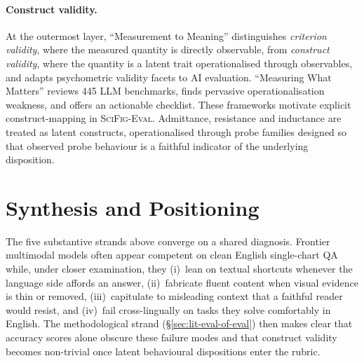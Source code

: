 \paragraph{Construct validity.} At the outermost layer, ``Measurement
to Meaning'' \citep{salaudeen2025measurement} distinguishes
\emph{criterion validity}, where the measured quantity is directly
observable, from \emph{construct validity}, where the quantity is a
latent trait operationalised through observables, and adapts
psychometric validity facets to AI evaluation. ``Measuring What
Matters'' \citep{burnell2025measuring} reviews 445 LLM benchmarks,
finds pervasive operationalisation weakness, and offers an
actionable checklist. These frameworks motivate explicit
construct-mapping in \textsc{SciFig-Eval}. Admittance, resistance
and inductance are treated as latent constructs, operationalised
through probe families designed so that observed probe behaviour is
a faithful indicator of the underlying disposition.

\section{Synthesis and Positioning}
\label{sec:lit-synthesis}

The five substantive strands above converge on a shared diagnosis.
Frontier multimodal models often appear competent on clean English
single-chart QA while, under closer examination, they
(i)~lean on textual shortcuts whenever the language side affords an
answer, (ii)~fabricate fluent content when visual evidence is thin
or removed, (iii)~capitulate to misleading context that a faithful
reader would resist, and (iv)~fail cross-lingually on tasks they
solve comfortably in English. The methodological strand
(\S\ref{sec:lit-eval-of-eval}) then makes clear that accuracy scores
alone obscure these failure modes and that construct validity
becomes non-trivial once latent behavioural dispositions enter the
rubric.

